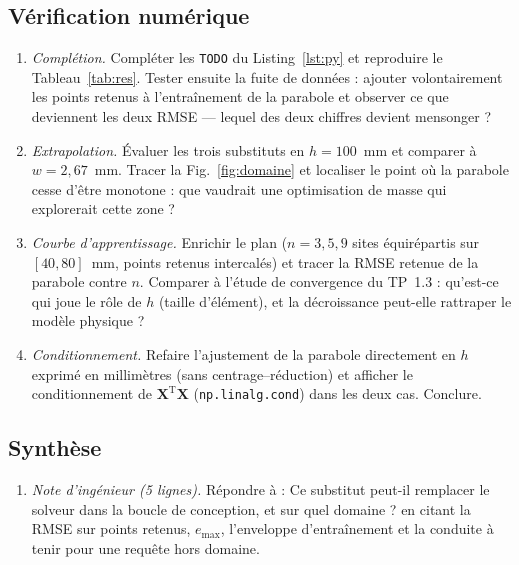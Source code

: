 \documentclass[10pt,journal]{IEEEtran}
\begin{document}
\subsection{Vérification numérique}
\begin{enumerate}[leftmargin=1.4em]
\item \emph{Complétion.} Compléter les \texttt{TODO} du Listing~\ref{lst:py} et reproduire le Tableau~\ref{tab:res}. Tester ensuite la fuite de données : ajouter volontairement les points retenus à l'entraînement de la parabole et observer ce que deviennent les deux RMSE --- lequel des deux chiffres devient mensonger ?
\item \emph{Extrapolation.} Évaluer les trois substituts en $h=100$~mm et comparer à $w=2{,}67$~mm. Tracer la Fig.~\ref{fig:domaine} et localiser le point où la parabole cesse d'être monotone : que vaudrait une optimisation de masse qui explorerait cette zone ?
\item \emph{Courbe d'apprentissage.} Enrichir le plan ($n = 3, 5, 9$ sites équirépartis sur $[40,80]$~mm, points retenus intercalés) et tracer la RMSE retenue de la parabole contre $n$. Comparer à l'étude de convergence du TP~1.3 : qu'est-ce qui joue le rôle de $h$ (taille d'élément), et la décroissance peut-elle rattraper le modèle physique ?
\item \emph{Conditionnement.} Refaire l'ajustement de la parabole directement en $h$ exprimé en millimètres (sans centrage--réduction) et afficher le conditionnement de $\mathbf{X}^{\mathrm T}\mathbf{X}$ (\texttt{np.linalg.cond}) dans les deux cas. Conclure.
\end{enumerate}

\subsection{Synthèse}
\begin{enumerate}[leftmargin=1.4em]
\item \emph{Note d'ingénieur (5 lignes).} Répondre à : \og Ce substitut peut-il remplacer le solveur dans la boucle de conception, et sur quel domaine ?\fg{} en citant la RMSE sur points retenus, $e_{\max}$, l'enveloppe d'entraînement et la conduite à tenir pour une requête hors domaine.
\end{enumerate}
\end{document}

